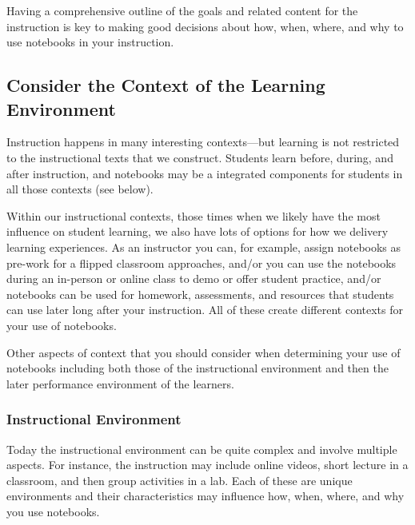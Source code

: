 \documentclass[]{book}
\begin{document}
Having a comprehensive outline of the goals and related content for the
instruction is key to making good decisions about how, when, where, and
why to use notebooks in your instruction.

\subsection{Consider the Context of the Learning
Environment}\label{consider-the-context-of-the-learning-environment}

Instruction happens in many interesting contexts---but learning is not
restricted to the instructional texts that we construct. Students learn
before, during, and after instruction, and notebooks may be a integrated
components for students in all those contexts (see below).

Within our instructional contexts, those times when we likely have the
most influence on student learning, we also have lots of options for how
we delivery learning experiences. As an instructor you can, for example,
assign notebooks as pre-work for a flipped classroom approaches, and/or
you can use the notebooks during an in-person or online class to demo or
offer student practice, and/or notebooks can be used for homework,
assessments, and resources that students can use later long after your
instruction. All of these create different contexts for your use of
notebooks.

Other aspects of context that you should consider when determining your
use of notebooks including both those of the instructional environment
and then the later performance environment of the learners.

\subsubsection{Instructional
Environment}\label{instructional-environment}

Today the instructional environment can be quite complex and involve
multiple aspects. For instance, the instruction may include online
videos, short lecture in a classroom, and then group activities in a
lab. Each of these are unique environments and their characteristics may
influence how, when, where, and why you use notebooks.
\end{document}
